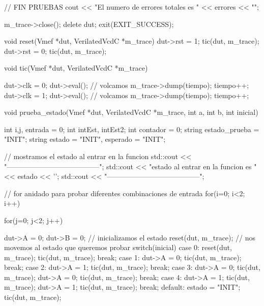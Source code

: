 \begin{mycode}[style=verilogstyle, caption={Banco de pruebas en C++ que se simula con Verilator.}, label=lst:mef-verilator]
{        // FIN PRUEBAS
        cout << "El numero de errores totales es " << errores << "\n\n";
    
    
        m_trace->close();
        delete dut;
        exit(EXIT_SUCCESS);
    }
    
    void reset(Vmef *dut, VerilatedVcdC *m_trace){
        dut->rst = 1;
        tic(dut, m_trace);
        dut->rst = 0;
        tic(dut, m_trace);
    }
    
    void tic(Vmef *dut, VerilatedVcdC *m_trace){
        dut->clk = 0;
        dut->eval();
        // volcamos 
        m_trace->dump(tiempo);
        tiempo++;
        dut->clk = 1;
        dut->eval();
        // volcamos 
        m_trace->dump(tiempo);
        tiempo++;
    
    }
    
    void prueba_estado(Vmef *dut, VerilatedVcdC *m_trace, int a, int b, int inicial){
        int i,j, entrada = 0;
        int intEst, intEst2;
        int contador = 0;
        string estado_prueba = "INIT"; 
        string estado = "INIT", esperado = "INIT"; 
    
        // mostramos el estado al entrar en la funcion
        std::cout << "\n\n---------------------------------------";
        std::cout << "\nEl estado al entrar en la funcion es " << estado << '\n';
        std::cout << "---------------------------------------";
        
        // for anidado para probar diferentes combinaciones de entrada
        for(i=0; i<2; i++){
            for(j=0; j<2; j++){
                dut->A = 0;
                dut->B = 0;
                // inicializamos el estado
                reset(dut, m_trace);
                // nos movemos al estado que queremos probar
                switch(inicial){
                    case 0: reset(dut, m_trace);
                            tic(dut, m_trace);
                            break;
                    case 1: dut->A = 0; 
                            tic(dut, m_trace);
                            break;
                    case 2: dut->A = 1; 
                            tic(dut, m_trace);
                            break;
                    case 3: dut->A = 0; 
                            tic(dut, m_trace);
                            dut->A = 0; 
                            tic(dut, m_trace);
                            break;
                    case 4: dut->A = 1; 
                            tic(dut, m_trace);
                            dut->A = 1;
                            tic(dut, m_trace);
                            break;
                    default: estado = "INIT";
                             tic(dut, m_trace);
                }
    
}}}
\end{mycode}
